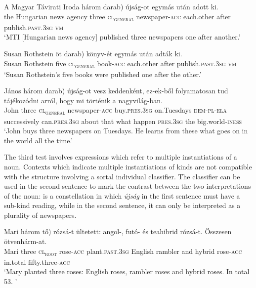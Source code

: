 \documentclass[output=paper]{langscibook}
\begin{document}
\ea \label{schv-nem:ex:13}
\gll  A Magyar Távirati Iroda három \minsp{(*} darab) újság-ot egymás után adott ki. \\
the Hungarian news agency three {} \textsc{cl\textsubscript{general}} newspaper-\textsc{acc} each.other after publish.\textsc{past}.\textsc{3sg} \textsc{vm}\\
\glt `MTI [Hungarian news agency] %
published three newspapers one after another.'
\z

\ea \label{schv-nem:ex:14}
\gll  Susan Rothstein öt \minsp{(*} darab) könyv-ét egymás után adták ki. \\
 Susan Rothstein five {} \textsc{cl\textsubscript{general}} book-\textsc{acc} each.other after publish.\textsc{past}.\textsc{3sg} \textsc{vm} \\
\glt `Susan Rothstein’s five books were published one after the other.'
\z

\ea \label{schv-nem:ex:15}
\gll János három \minsp{(*} darab) újság-ot vesz keddenként, ez-ek-ből folyamatosan tud tájékozódni arról, hogy mi történik a nagyvilág-ban. \\
John three {} \textsc{cl\textsubscript{general}} newspaper-\textsc{acc} buy.\textsc{pres}.\textsc{3sg} on.Tuesdays   \textsc{dem}-\textsc{pl}-\textsc{ela} successively can.\textsc{pres}.\textsc{3sg} about that what happen \textsc{pres}.\textsc{3sg} the big.world-\textsc{iness}\\
\glt `John buys three newspapers on Tuesdays. He learns from these what goes on in the world all the time.'
\z

\noindent The third test involves expressions which refer to multiple instantiations of a noun. Contexts which indicate multiple instantiations of kinds are not compatible with the structure involving a sortal individual classifier. The classifier can be used in the second sentence to mark the contrast between the two interpretations of the noun:  is a constellation in which \textit{újság} in the first sentence must have a sub-kind reading, while in the second sentence, it can only be interpreted as a plurality of newspapers. 

\ea \label{schv-nem:ex:16}
\gll Mari három \minsp{(*} tő) rózsá-t ültetett: angol-, futó- és teahibrid  rózsá-t. Összesen ötvenhárm-at. \\
 Mari three {} \textsc{cl\textsubscript{root}} rose-\textsc{acc} plant.\textsc{past}.\textsc{3sg} English  rambler and  hybrid  rose-\textsc{acc}  in.total    fifty.three-\textsc{acc}\\
\glt `Mary planted three roses: English roses, rambler roses and hybrid roses. In total 53. '
\z 
\end{document}
